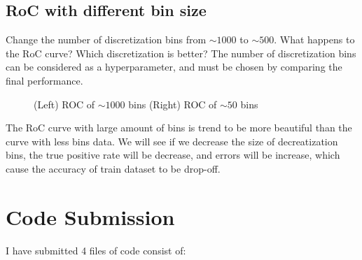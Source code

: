 \documentclass[12pt]{article}
\begin{document}
\subsection{RoC with different bin size}
Change the number of discretization bins from ${\sim}1000$ to ${\sim}500$. What happens to the RoC curve? Which discretization is better? The number of discretization bins can be considered as a hyperparameter, and must be chosen by comparing the final performance.

\begin{figure}[H]
  \noindent\par
  \hfill
  \par
  \caption{(Left) ROC of ${\sim}1000$ bins (Right) ROC of ${\sim}50$ bins}
  \end{figure}

The RoC curve with large amount of bins is trend to be more beautiful than the curve with less bins data.
We will see if we decrease the size of decreatization bins, the true positive rate will be decrease,
and errors will be increase, which cause the accuracy of train dataset to be drop-off.

\section*{Code Submission}

I have submitted 4 files of code consist of:
\end{document}
